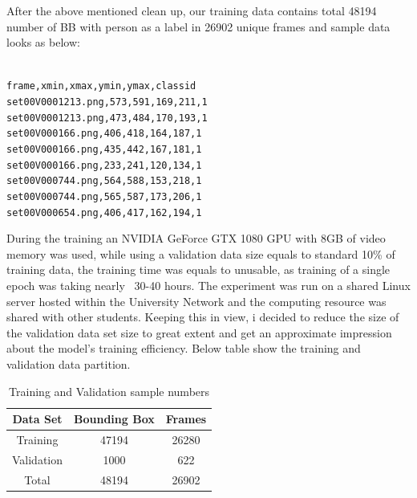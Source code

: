 After the above mentioned clean up, our training data contains total 48194 number of BB with person as a label in 26902 unique frames and sample data looks as below:
\begin{center}
\texttt{  \\
frame,xmin,xmax,ymin,ymax,class\textunderscore id \\
set00\textunderscore V000\textunderscore 1213.png,573,591,169,211,1 \\
set00\textunderscore V000\textunderscore 1213.png,473,484,170,193,1 \\
set00\textunderscore V000\textunderscore 166.png,406,418,164,187,1 \\
set00\textunderscore V000\textunderscore 166.png,435,442,167,181,1 \\
set00\textunderscore V000\textunderscore 166.png,233,241,120,134,1 \\
set00\textunderscore V000\textunderscore 744.png,564,588,153,218,1 \\
set00\textunderscore V000\textunderscore 744.png,565,587,173,206,1 \\
set00\textunderscore V000\textunderscore 654.png,406,417,162,194,1 \\
}
\end{center}

During the training an NVIDIA GeForce GTX 1080 GPU with 8GB of video memory was used, while using a validation data size equals to standard 10\% of training data, the training time was equals to unusable, as training of a single epoch was taking nearly ~30-40 hours. The experiment was run on a shared Linux server hosted within the University Network and the computing resource was shared with other students. Keeping this in view, i decided to reduce the size of the validation data set size to great extent and get an approximate impression about the model's training efficiency. Below table show the training and validation data partition.

\begin {table}[H]
\begin{center}
 \begin{tabular}{||c c c||}
 \hline
 Data Set & Bounding Box & Frames\\ [0.8ex] 
 \hline\hline
 Training & 47194 & 26280 \\
 \hline
 Validation & 1000 & 622 \\
 \hline
 Total & 48194 & 26902 \\
 \hline
\end{tabular}
\caption{Training and Validation sample numbers}
\end{center}
\end {table}

